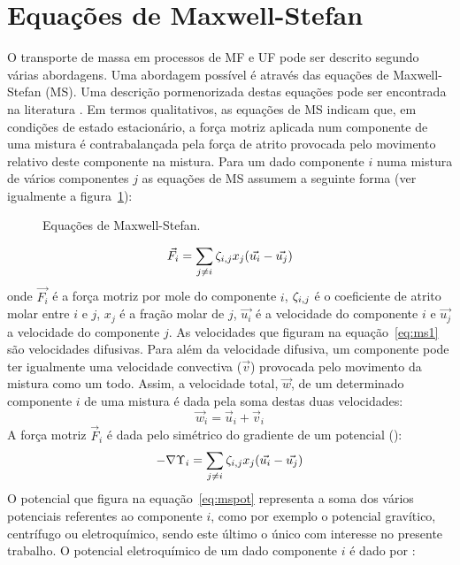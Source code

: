 \section{Equações de Maxwell-Stefan}
\label{sec:ems}
O transporte de massa em processos de MF e UF pode ser descrito segundo várias abordagens. Uma abordagem possível é através das equações de Maxwell-Stefan (MS). Uma descrição pormenorizada destas equações pode ser encontrada na literatura \cite{wesslivro,krishna,noordman,taylor}. Em termos qualitativos, as equações de MS indicam que, em condições de estado estacionário, a força motriz aplicada num componente de uma mistura é contrabalançada pela força de atrito provocada pelo movimento relativo deste componente na mistura. Para um dado componente $i$ numa mistura de vários componentes $j$ as equações de MS assumem a seguinte forma (ver igualmente a figura~\ref{fig:MSteste}):
\begin{figure}
\centering

\caption{Equações de Maxwell-Stefan.}
\label{fig:MSteste}
\end{figure}
\begin{equation}
	\label{eq:ms1}
	\vec{F_{i}}=\sum_{j\neq i} \zeta_{i,j}x_{j}(\vec{u_{i}}-\vec{u_{j}})
\end{equation}
%
onde $\vec{F_{i}}$ é a força motriz por mole do componente $i$, $\zeta_{i,j}$ é o coeficiente de atrito molar entre $i$ e $j$, $x_{j}$ é a fração molar de $j$, $\vec{u_{i}}$ é a velocidade do componente $i$ e $\vec{u_{j}}$ a velocidade do componente $j$. As velocidades que figuram na equação~\ref{eq:ms1} são velocidades difusivas. Para além da velocidade difusiva, um componente pode ter igualmente uma velocidade convectiva ($\vec{v}$) provocada pelo movimento da mistura como um todo. Assim, a velocidade total, $\vec{w}$, de um determinado componente $i$ de uma mistura é dada pela soma destas duas velocidades:
\begin{equation}
	\label{eq:veltotal}
	\vec{w}_{i}=\vec{u}_{i}+\vec{v}_{i}
\end{equation}
A força motriz $\vec{F}_{i}$ é dada pelo simétrico do gradiente de um potencial (\potencialms):
\begin{equation}
 	\label{eq:mspot}
 	-\nabla\Upsilon_i=\sum_{j\neq i} \zeta_{i,j}x_{j}(\vec{u_{i}}-\vec{u_{j}})
 \end{equation}%
O potencial que figura na equação~\ref{eq:mspot} representa a soma dos vários potenciais referentes ao componente $i$, como por exemplo o potencial gravítico, centrífugo ou eletroquímico, sendo este último o único com interesse no presente trabalho. O potencial eletroquímico de um dado componente $i$ é dado por \cite{bowen02}:
